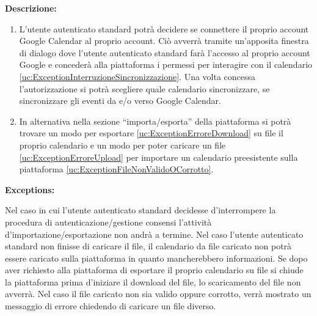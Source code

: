 \begin{listaPersonale}[UC]{}
    \textbf{Descrizione:}
    \begin{enumerate}
        \item L'utente autenticato standard potrà decidere se connettere il proprio account Google Calendar al proprio account. Ciò avverrà tramite un'apposita finestra di dialogo dove l'utente autenticato standard farà l'accesso al proprio account Google e concederà alla piattaforma i permessi per interagire con il calendario \ref{uc:ExceptionInterruzioneSincronizzazione}. Una volta concessa l'autorizzazione si potrà scegliere quale calendario sincronizzare, se sincronizzare gli eventi da e/o verso Google Calendar.
        \item In alternativa nella sezione “importa/esporta” della piattaforma si potrà trovare un modo per esportare \ref{uc:ExceptionErroreDownload} su file il proprio calendario e un modo per poter caricare un file \ref{uc:ExceptionErroreUpload} per importare un calendario preesistente sulla piattaforma \ref{uc:ExceptionFileNonValidoOCorrotto}.
    \end{enumerate}

    \textbf{Exceptions:}
    \begin{enumerate}[label=\textbf{[exception \arabic{enumii}]}, ref= \textbf{[exception \arabic{enumii}]}]
         Nel caso in cui l'utente autenticato standard decidesse d'interrompere la procedura di autenticazione/gestione consensi l'attività d'importazione/esportazione non andrà a termine.
         Nel caso l'utente autenticato standard non finisse di caricare il file, il calendario da file caricato non potrà essere caricato sulla piattaforma in quanto mancherebbero informazioni.
         Se dopo aver richiesto alla piattaforma di esportare il proprio calendario su file si chiude la piattaforma prima d'iniziare il download del file, lo scaricamento del file non avverrà.
         Nel caso il file caricato non sia valido oppure corrotto, verrà mostrato un messaggio di errore chiedendo di caricare un file diverso.
    \end{enumerate}




    \newpage



\end{listaPersonale}
